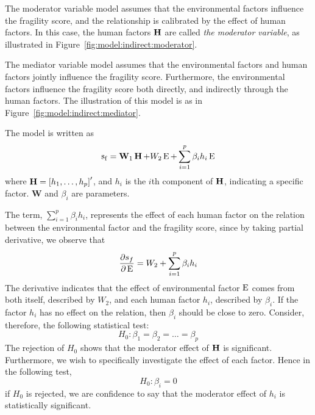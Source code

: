 The moderator variable model assumes that the environmental factors influence the fragility score, and the relationship is calibrated by the effect of human factors. 
In this case, the human factors $\operatorname*{\mathbf{H}}$ are called \emph{the moderator variable}, as illustrated in Figure~\ref{fig:model:indirect:moderator}.

The mediator variable model assumes that the environmental factors and human factors jointly influence the fragility score.
Furthermore, the environmental factors influence the fragility score both directly, and indirectly through the human factors. The illustration of this model is as in Figure~\ref{fig:model:indirect:mediator}.

The model is written as 
\begin{equation}
    \operatorname*{s_f} = \mathbf{W}_1\operatorname*{\mathbf{H}} + W_2\operatorname*{E} + \sum_{i=1}^p \beta_i h_i \operatorname*{E} 
    \label{eqn:model:moderator_model}
\end{equation}
where $\operatorname*{\mathbf{H}}=\left[ h_1,\ldots,h_p \right]'$, and $h_i$ is the $i$th component of $\operatorname*{\mathbf{H}}$, indicating a specific factor. $\mathbf{W}$ and $\beta_i$ are parameters.

The term, $\sum_{i=1}^p\beta_i h_i$, represents the effect of each human factor on the relation between the environmental factor and the fragility score, since by taking partial derivative, we observe that 
\begin{equation*}
    \frac{\partial s_f}{\partial \operatorname*{E}} = W_2 + \sum_{i=1}^p \beta_i h_i
\end{equation*}
The derivative indicates that the effect of environmental factor $\operatorname*{E}$ comes from both itself, described by $W_2$, and each human factor $h_i$, described by $\beta_i$. If the factor $h_i$ has no effect on the relation, then $\beta_i$ should be close to zero. Consider, therefore, the following statistical test:
\begin{equation}
    H_0: \beta_1=\beta_2=\ldots=\beta_p
    \label{eqn:model:moderator:testall}
\end{equation}
The rejection of $H_0$ shows that the moderator effect of $\operatorname*{\mathbf{H}}$ is significant. 
Furthermore, we wish to specifically investigate the effect of each factor. Hence in the following test,
\begin{equation}
   H_0:\beta_i=0 
   \label{eqn:model:moderator:testi}
\end{equation}
if $H_0$ is rejected, we are confidence to say that the moderator effect of $h_i$ is statistically significant.


